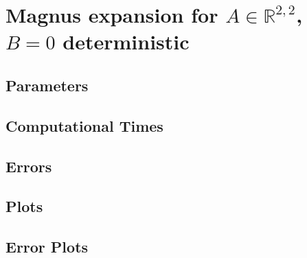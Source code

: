 \section{Magnus expansion for $A\in \mathbb{R}^{2,2}$, $B=0$ deterministic}
	
\subsection{Parameters}
	
\subsection{Computational Times}
	
\subsection{Errors}
	
\subsection{Plots}
	
\subsection{Error Plots}
	
